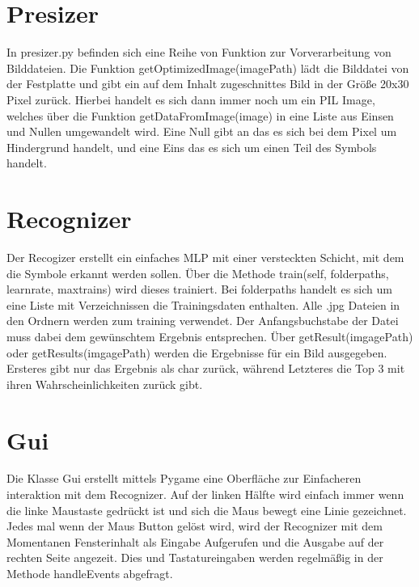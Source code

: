 \documentclass[a4paper]{article}
\begin{document}
	\section{Presizer}
		In presizer.py befinden sich eine Reihe von Funktion zur Vorverarbeitung von Bilddateien.
		Die Funktion getOptimizedImage(imagePath) lädt die Bilddatei von der Festplatte und gibt ein auf dem Inhalt zugeschnittes 
		Bild in der Größe 20x30 Pixel zurück. Hierbei handelt es sich dann immer noch um ein PIL Image, welches über die Funktion
		getDataFromImage(image) in eine Liste aus Einsen und Nullen umgewandelt wird. Eine Null gibt an das es sich bei dem Pixel um 
		Hindergrund handelt, und eine Eins das es sich um einen Teil des Symbols handelt.

	\section{Recognizer} 
		Der Recogizer erstellt ein einfaches MLP mit einer versteckten Schicht, mit dem die Symbole erkannt werden sollen.
		Über die Methode train(self, folderpaths, learnrate, maxtrains) wird dieses trainiert. Bei folderpaths handelt es 
		sich um eine Liste mit Verzeichnissen die Trainingsdaten enthalten. Alle .jpg Dateien in den Ordnern werden zum training 
		verwendet. Der Anfangsbuchstabe der Datei muss dabei dem gewünschtem Ergebnis entsprechen.
		Über getResult(imgagePath) oder getResults(imgagePath) werden die Ergebnisse für ein Bild ausgegeben. Ersteres gibt 
		nur das Ergebnis als char zurück, während Letzteres die Top 3 mit ihren Wahrscheinlichkeiten zurück gibt.

	\section{Gui}
		Die Klasse Gui erstellt mittels Pygame eine Oberfläche zur Einfacheren interaktion mit dem Recognizer.
		Auf der linken Hälfte wird einfach immer wenn die linke Maustaste gedrückt ist und sich die Maus bewegt eine Linie 
		gezeichnet. Jedes mal wenn der Maus Button gelöst wird, wird der Recognizer mit dem Momentanen Fensterinhalt als
		Eingabe Aufgerufen und die Ausgabe auf der rechten Seite angezeit. Dies und Tastatureingaben werden regelmäßig 
		in der Methode handleEvents abgefragt.


	
\end{document}
